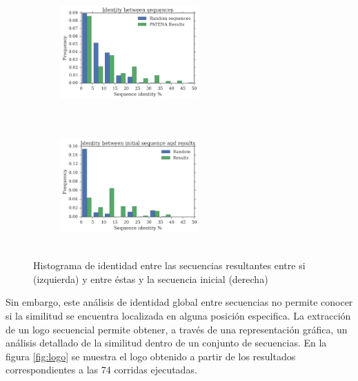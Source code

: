 \begin{figure}[htbp]
  \begin{subfigure}[b]{200px}
    \includegraphics[width=200px,height=175px]{img/resultados/againstAll-random.png}
    \label{fig:identity-a}
    \end{subfigure}
  \hspace{20px}
  \begin{subfigure}[b]{200px}
  \includegraphics[width=200px,height=175px]{img/resultados/againstInitial-random.png}
    \label{fig:identity-b}
  \end{subfigure}
  \caption{Histograma de identidad entre las secuencias resultantes entre si (izquierda) y entre éstas y la secuencia inicial (derecha)}
  \label{fig:identity}
\end{figure}



Sin embargo, este análisis de identidad global entre secuencias no permite conocer si la similitud se encuentra localizada en alguna posición especifica.
La extracción de un logo secuencial \cite{schneider1990sequence} permite obtener, a través de una representación gráfica, un análisis detallado de la similitud dentro de un conjunto de secuencias.
En la figura \ref{fig:logo} se muestra el logo obtenido a partir de los resultados correspondientes a las 74 corridas ejecutadas.


